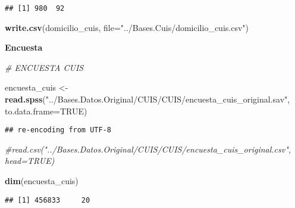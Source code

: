\documentclass[11pt,]{article}
\newenvironment{Shaded}{\begin{snugshade}}{\end{snugshade}}
\newcommand{\KeywordTok}[1]{\textcolor[rgb]{0.13,0.29,0.53}{\textbf{#1}}}
\newcommand{\DataTypeTok}[1]{\textcolor[rgb]{0.13,0.29,0.53}{#1}}
\newcommand{\DecValTok}[1]{\textcolor[rgb]{0.00,0.00,0.81}{#1}}
\newcommand{\StringTok}[1]{\textcolor[rgb]{0.31,0.60,0.02}{#1}}
\newcommand{\CommentTok}[1]{\textcolor[rgb]{0.56,0.35,0.01}{\textit{#1}}}
\newcommand{\OtherTok}[1]{\textcolor[rgb]{0.56,0.35,0.01}{#1}}
\newcommand{\OperatorTok}[1]{\textcolor[rgb]{0.81,0.36,0.00}{\textbf{#1}}}
\newcommand{\NormalTok}[1]{#1}
\begin{document}
\begin{verbatim}
## [1] 980  92
\end{verbatim}

\begin{Shaded}
\begin{Highlighting}[]
\KeywordTok{write.csv}\NormalTok{(domicilio_cuis, }\DataTypeTok{file=}\StringTok{"../Bases.Cuis/domicilio_cuis.csv"}\NormalTok{)}
\end{Highlighting}
\end{Shaded}

\textbf{Encuesta}

\begin{Shaded}
\begin{Highlighting}[]
\CommentTok{# ENCUESTA CUIS}

\NormalTok{encuesta_cuis <-}\StringTok{ }\KeywordTok{read.spss}\NormalTok{(}\StringTok{"../Bases.Datos.Original/CUIS/CUIS/encuesta_cuis_original.sav"}\NormalTok{, }\DataTypeTok{to.data.frame=}\OtherTok{TRUE}\NormalTok{)}
\end{Highlighting}
\end{Shaded}

\begin{verbatim}
## re-encoding from UTF-8
\end{verbatim}

\begin{Shaded}
\begin{Highlighting}[]
                \CommentTok{#read.csv("../Bases.Datos.Original/CUIS/CUIS/encuesta_cuis_original.csv", head=TRUE)}

\KeywordTok{dim}\NormalTok{(encuesta_cuis)}
\end{Highlighting}
\end{Shaded}

\begin{verbatim}
## [1] 456833     20
\end{verbatim}

\begin{Shaded}
\end{Shaded}
\end{document}
